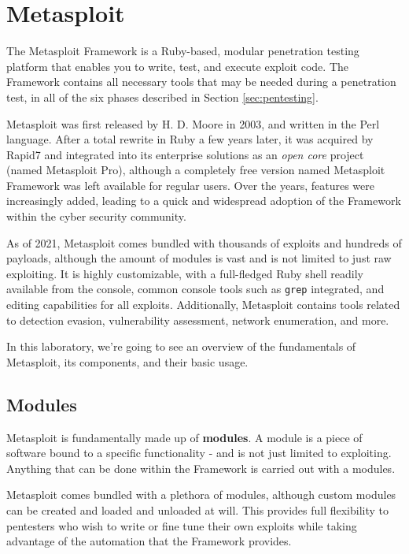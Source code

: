 \section{Metasploit}
\label{sec:metasploit}

The Metasploit Framework is a Ruby-based, modular penetration testing platform that enables you to write, test, and execute exploit code. The Framework contains all necessary tools that may be needed during a penetration test, in all of the six phases described in Section \ref{sec:pentesting}.

Metasploit was first released by H. D. Moore in 2003, and written in the Perl language. After a total rewrite in Ruby a few years later, it was acquired by Rapid7 and integrated into its enterprise solutions as an \textit{open core} project (named Metasploit Pro), although a completely free version named Metasploit Framework was left available for regular users. Over the years, features were increasingly added, leading to a quick and widespread adoption of the Framework within the cyber security community.\cite{online:msf-overview}

As of 2021, Metasploit comes bundled with thousands of exploits and hundreds of payloads, although the amount of modules is vast and is not limited to just raw exploiting. It is highly customizable, with a full-fledged Ruby shell readily available from the console, common console tools such as \texttt{grep} integrated, and editing capabilities for all exploits. Additionally, Metasploit contains tools related to detection evasion, vulnerability assessment, network enumeration, and more.

In this laboratory, we're going to see an overview of the fundamentals of Metasploit, its components, and their basic usage.

\subsection{Modules}

Metasploit is fundamentally made up of \textbf{modules}. A module is a piece of software bound to a specific functionality - and is not just limited to exploiting. Anything that can be done within the Framework is carried out with a modules.

Metasploit comes bundled with a plethora of modules, although custom modules can be created and loaded and unloaded at will. This provides full flexibility to pentesters who wish to write or fine tune their own exploits while taking advantage of the automation that the Framework provides.

